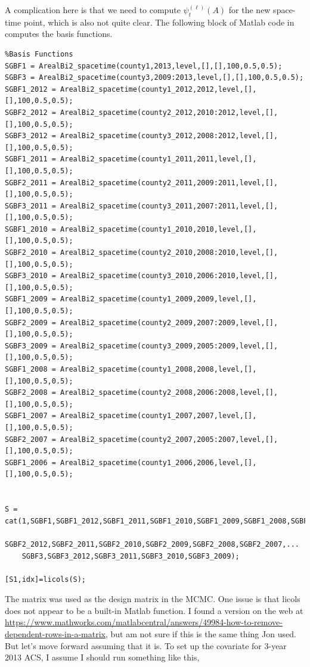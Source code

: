 \documentclass[10pt]{article}
\begin{document}
A complication here is that we need to compute $\psi_t^{(\ell)}(A)$ for the new space-time point, which is also not quite clear. The following block of Matlab code in  computes the basis functions.

\begin{lstlisting}
%Basis Functions
SGBF1 = ArealBi2_spacetime(county1,2013,level,[],[],100,0.5,0.5);
SGBF3 = ArealBi2_spacetime(county3,2009:2013,level,[],[],100,0.5,0.5);
SGBF1_2012 = ArealBi2_spacetime(county1_2012,2012,level,[],[],100,0.5,0.5);
SGBF2_2012 = ArealBi2_spacetime(county2_2012,2010:2012,level,[],[],100,0.5,0.5);
SGBF3_2012 = ArealBi2_spacetime(county3_2012,2008:2012,level,[],[],100,0.5,0.5);
SGBF1_2011 = ArealBi2_spacetime(county1_2011,2011,level,[],[],100,0.5,0.5);
SGBF2_2011 = ArealBi2_spacetime(county2_2011,2009:2011,level,[],[],100,0.5,0.5);
SGBF3_2011 = ArealBi2_spacetime(county3_2011,2007:2011,level,[],[],100,0.5,0.5);
SGBF1_2010 = ArealBi2_spacetime(county1_2010,2010,level,[],[],100,0.5,0.5);
SGBF2_2010 = ArealBi2_spacetime(county2_2010,2008:2010,level,[],[],100,0.5,0.5);
SGBF3_2010 = ArealBi2_spacetime(county3_2010,2006:2010,level,[],[],100,0.5,0.5);
SGBF1_2009 = ArealBi2_spacetime(county1_2009,2009,level,[],[],100,0.5,0.5);
SGBF2_2009 = ArealBi2_spacetime(county2_2009,2007:2009,level,[],[],100,0.5,0.5);
SGBF3_2009 = ArealBi2_spacetime(county3_2009,2005:2009,level,[],[],100,0.5,0.5);
SGBF1_2008 = ArealBi2_spacetime(county1_2008,2008,level,[],[],100,0.5,0.5);
SGBF2_2008 = ArealBi2_spacetime(county2_2008,2006:2008,level,[],[],100,0.5,0.5);
SGBF1_2007 = ArealBi2_spacetime(county1_2007,2007,level,[],[],100,0.5,0.5);
SGBF2_2007 = ArealBi2_spacetime(county2_2007,2005:2007,level,[],[],100,0.5,0.5);
SGBF1_2006 = ArealBi2_spacetime(county1_2006,2006,level,[],[],100,0.5,0.5);


S = cat(1,SGBF1,SGBF1_2012,SGBF1_2011,SGBF1_2010,SGBF1_2009,SGBF1_2008,SGBF1_2007,SGBF1_2006,...
    SGBF2_2012,SGBF2_2011,SGBF2_2010,SGBF2_2009,SGBF2_2008,SGBF2_2007,...
    SGBF3,SGBF3_2012,SGBF3_2011,SGBF3_2010,SGBF3_2009);

[S1,idx]=licols(S);
\end{lstlisting}
%
The matrix  was used as the design matrix in the MCMC. One issue is that licols does not appear to be a built-in Matlab function. I found a version on the web at \url{https://www.mathworks.com/matlabcentral/answers/49984-how-to-remove-dependent-rows-in-a-matrix}, but am not sure if this is the same thing Jon used. But let's move forward assuming that it is. To set up the covariate for 3-year 2013 ACS, I assume I should run something like this,
\end{document}
